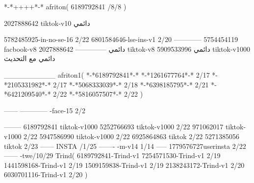 *-*++++*-*
afriton(
6189792841 /8/8
)

2027888642 tiktok-v10
دائمي

5782485925-in-no-se-16 2/22
6801584646-lse-ins-v1 2/20
------------
5754454119 facbook-v8
دائمي
--------------
2027888642 tiktok-v8
دائمي
5909533996 tiktok-v1000
دائمي مع التحديث

__________
afriton1(
*-*6189792841*-*
*-*1261677764*-* 2/17
*-*2105331982*-* 2/17
*-*5068333039*-* 2/18
*-*6398185795*-* 2/21
*-*6421209540*-* 2/22
*-*5816057507*-* 2/22
)

------
------------
-face-15 2/2

--------
6189792841 tiktok-v1000
5252766693 tiktok-v1000 2/22
971062017 tiktok-v1000 2/22
5947586990 tiktok-v1000 2/22
6925864863 tiktok 2/22
5271385056 tiktok 2/23
------
 INSTA /1/25
-------
-m-v14 1/14
-----
1779576727userinsta 2/22
------
-twe/10/29
Trind(
6189792841-Trind-v1 
7254571530-Trind-v1 2/19
1441598168-Trind-v1 2/19
1509159838-Trind-v1 2/19
2138243172-Trind-v1 2/20
6030701116-Trind-v1 2/20
)
